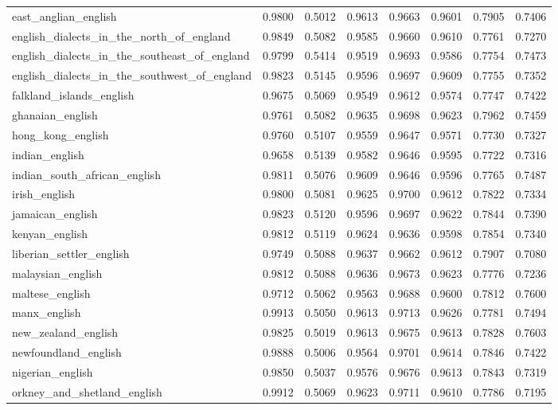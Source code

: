 \begin{landscape}
\begin{longtable}{lccccccc}
east\_anglian\_english & 0.9800 & 0.5012 & 0.9613 & 0.9663 & 0.9601 & 0.7905 & 0.7406 \\
english\_dialects\_in\_the\_north\_of\_england & 0.9849 & 0.5082 & 0.9585 & 0.9660 & 0.9610 & 0.7761 & 0.7270 \\
english\_dialects\_in\_the\_southeast\_of\_england & 0.9799 & 0.5414 & 0.9519 & 0.9693 & 0.9586 & 0.7754 & 0.7473 \\
english\_dialects\_in\_the\_southwest\_of\_england & 0.9823 & 0.5145 & 0.9596 & 0.9697 & 0.9609 & 0.7755 & 0.7352 \\
falkland\_islands\_english & 0.9675 & 0.5069 & 0.9549 & 0.9612 & 0.9574 & 0.7747 & 0.7422 \\
ghanaian\_english & 0.9761 & 0.5082 & 0.9635 & 0.9698 & 0.9623 & 0.7962 & 0.7459 \\
hong\_kong\_english & 0.9760 & 0.5107 & 0.9559 & 0.9647 & 0.9571 & 0.7730 & 0.7327 \\
indian\_english & 0.9658 & 0.5139 & 0.9582 & 0.9646 & 0.9595 & 0.7722 & 0.7316 \\
indian\_south\_african\_english & 0.9811 & 0.5076 & 0.9609 & 0.9646 & 0.9596 & 0.7765 & 0.7487 \\
irish\_english & 0.9800 & 0.5081 & 0.9625 & 0.9700 & 0.9612 & 0.7822 & 0.7334 \\
jamaican\_english & 0.9823 & 0.5120 & 0.9596 & 0.9697 & 0.9622 & 0.7844 & 0.7390 \\
kenyan\_english & 0.9812 & 0.5119 & 0.9624 & 0.9636 & 0.9598 & 0.7854 & 0.7340 \\
liberian\_settler\_english & 0.9749 & 0.5088 & 0.9637 & 0.9662 & 0.9612 & 0.7907 & 0.7080 \\
malaysian\_english & 0.9812 & 0.5088 & 0.9636 & 0.9673 & 0.9623 & 0.7776 & 0.7236 \\
maltese\_english & 0.9712 & 0.5062 & 0.9563 & 0.9688 & 0.9600 & 0.7812 & 0.7600 \\
manx\_english & 0.9913 & 0.5050 & 0.9613 & 0.9713 & 0.9626 & 0.7781 & 0.7494 \\
new\_zealand\_english & 0.9825 & 0.5019 & 0.9613 & 0.9675 & 0.9613 & 0.7828 & 0.7603 \\
newfoundland\_english & 0.9888 & 0.5006 & 0.9564 & 0.9701 & 0.9614 & 0.7846 & 0.7422 \\
nigerian\_english & 0.9850 & 0.5037 & 0.9576 & 0.9676 & 0.9613 & 0.7843 & 0.7319 \\
orkney\_and\_shetland\_english & 0.9912 & 0.5069 & 0.9623 & 0.9711 & 0.9610 & 0.7786 & 0.7195 \\

\end{longtable}
\end{landscape}
